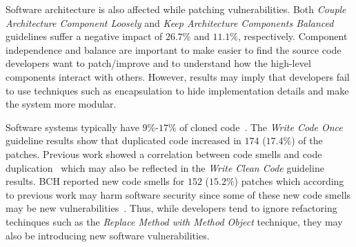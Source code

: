 \documentclass[10pt,conference]{IEEEtran}
\begin{document}
Software architecture is also affected while patching vulnerabilities.
Both \emph{Couple Architecture Component Loosely} and \emph{Keep
Architecture Components Balanced} guidelines suffer a negative impact of 
$26.7\%$ and $11.1\%$, respectively. Component independence and balance
are important to make easier to find the source code developers
want to patch/improve and to understand how the high-level components
interact with others. However, results may imply that developers
fail to use techniques such as encapsulation to hide implementation
details and make the system more modular.

Software systems typically have $9\%$-$17\%$ of cloned code~\cite{5773403}. 
The \emph{Write Code Once} guideline results show that duplicated code 
increased in $174$ ($17.4\%$) of the patches. Previous work showed a 
correlation between code smells and code duplication~\cite{7476787} 
which may also be reflected in the \emph{Write Clean Code} guideline results. 
BCH reported new code smells for $152$ ($15.2\%$) patches which according 
to previous work may harm software security since some of these new code
smells may be new vulnerabilities~\cite{8819456}. Thus, while developers 
tend to ignore refactoring techinques such as the \emph{Replace Method 
with Method Object} technique, they may also be introducing new software 
vulnerabilities. 
\end{document}
